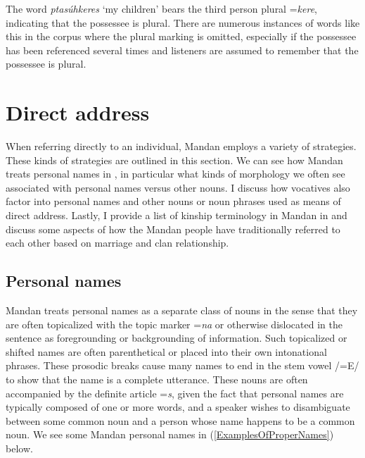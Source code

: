 The word \textit{ptasúhkeres} `my children' bears the third person plural =\textit{kere}, indicating that the possessee is plural. There are numerous instances of words like this in the corpus where the plural marking is omitted, especially if the possessee has been referenced several times and listeners are assumed to remember that the possessee is plural.

\section{Direct address}\label{SecDirectAddress}

When referring directly to an individual, Mandan employs a variety of strategies. These kinds of strategies are outlined in this section. We can see how Mandan treats personal names in , in particular what kinds of morphology we often see associated with personal names versus other nouns. I discuss how vocatives also factor into personal names and other nouns or noun phrases used as means of direct address. Lastly, I provide a list of kinship terminology in Mandan in  and discuss some aspects of how the Mandan people have traditionally referred to each other based on marriage and clan relationship.

\subsection{Personal names}\label{SubSecPersonalNames}

Mandan treats personal names as a separate class of nouns in the sense that they are often topicalized with the topic marker =\textit{na} or otherwise dislocated in the sentence as foregrounding or backgrounding of information. Such topicalized or shifted names are often parenthetical or placed into their own intonational phrases. These prosodic breaks cause many names to end in the stem vowel /=E/ to show that the name is a complete utterance. These nouns are often accompanied by the definite article =\textit{s}, given the fact that personal names are typically composed of one or more words, and a speaker wishes to disambiguate between some common noun and a person whose name happens to be a common noun. We see some Mandan personal names in (\ref{ExamplesOfProperNames}) below.

